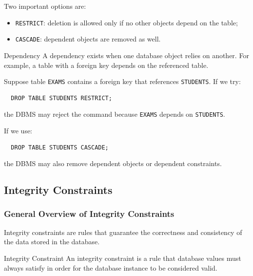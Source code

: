  \vspace{-0.2cm}

 Two important options are:
 \begin{itemize}
  \item \texttt{RESTRICT}: deletion is allowed only if no other objects depend on the table;
  \item \texttt{CASCADE}: dependent objects are removed as well.
 \end{itemize}

 \begin{defbox}{Dependency}
  A dependency exists when one database object relies on another. For example, a table with a foreign key depends on the referenced table.
 \end{defbox}

 \vs
 \begin{example}
  Suppose table \texttt{EXAMS} contains a foreign key that references \texttt{STUDENTS}. If we try:
  \begin{verbatim}
  DROP TABLE STUDENTS RESTRICT;
  \end{verbatim}

  \vspace{-0.3cm}
  the DBMS may reject the command because \texttt{EXAMS} depends on \texttt{STUDENTS}.

  If we use:
  \begin{verbatim}
  DROP TABLE STUDENTS CASCADE;
  \end{verbatim}

    \vspace{-0.3cm}
  the DBMS may also remove dependent objects or dependent constraints.
 \end{example}

\subsection{Integrity Constraints}

 \subsubsection{General Overview of Integrity Constraints}

 Integrity constraints are rules that guarantee the correctness and consistency of the data stored in the database.

 \begin{defbox}{Integrity Constraint}
  An integrity constraint is a rule that database values must always satisfy in order for the database instance to be considered valid.
 \end{defbox}

